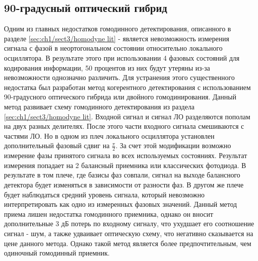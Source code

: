 \subsection{90-градусный оптический гибрид }\label{sec:ch1/sect3/90 hybrid lit}
Одним из главных недостатков гомодинного детектирования, описанного в разделе \ref{sec:ch1/sect3/homodyne lit} - является невозможность измерения сигнала с фазой в неортогональном состоянии относительно локального осциллятора. В результате этого при использовании 4 фазовых состояний для кодирования информации, 50 процентов из них будут утеряны из-за невозможности однозначно различить.
Для устранения этого существенного недостатка был разработан метод когерентного детектирования с использованием 90-градусного оптического гибрида или двойного гомодинирования. Данный метод развивает схему гомодинного детектирования из раздела \ref{sec:ch1/sect3/homodyne lit}. Входной сигнал и сигнал ЛО разделяются пополам на двух разных делителях. После этого части входного сигнала смешиваются с частями ЛО. Но в одном из плеч локального осциллятора установлен дополнительный фазовый сдвиг на $\frac{\pi}{2}$. За счет этой модификации возможно измерение фазы принятого сигнала во всех используемых состояниях. Результат измерения попадает на 2 балансный приемника или классических  фотодиода. В результате в том плече, где базисы фаз совпали, сигнал на выходе балансного детектора будет изменяться в зависимости от разности фаз. В другом же плече будет наблюдаться средний уровень сигнала, который невозможно интерпретировать как одно из измеренных фазовых значений. 
Данный метод приема лишен недостатка гомодинного приемника, однако он вносит дополнительные 3 дБ потерь по входному сигналу, что ухудшает его соотношение сигнал - шум, а также удваивает оптическую схему, что негативно сказывается на цене данного метода. Однако такой метод является более предпочтительным, чем одиночный гомодинный приемник. 
